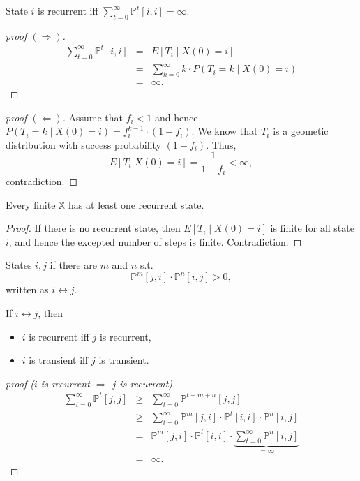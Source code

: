 \begin{lemma}
State $ i $ is recurrent iff $ \sum_{t = 0}^{\infty} \mathbb{P}^{t}[i, i] = \infty $.
\begin{proof}[proof $ (\Rightarrow) $]
\begin{eqnarray*}
\sum_{t = 0}^{\infty} \mathbb{P}^{t}[i, i]
  & = & E[T_{i} \mid X(0) = i] \\
  & = & \sum_{k = 0}^{\infty} k \cdot P(T_{i} = k \mid X(0) = i) \\
  & = & \infty.
\end{eqnarray*}
\end{proof}

\begin{proof}[proof $ (\Leftarrow) $]
Assume that $ f_{i} < 1 $ and hence $ P(T_{i} = k \mid X(0) = i) = f_{i}^{k - 1} \cdot (1 - f_{i}) $. We know that $ T_{i} $ is a geometic distribution with success probability $ (1 - f_{i}) $. Thus,
\[ E[T_{i} | X(0) = i] = \frac{1}{1 - f_{i}} < \infty, \]
contradiction.
\end{proof}
\end{lemma}

\begin{corollary} \label{cor:finite-X-has-recurrent-state}
Every finite $ \mathbb{X} $ has at least one recurrent state.
\begin{proof}
If there is no recurrent state, then $ E[T_{i} \mid X(0) = i] $ is finite for all state $ i $, and hence the excepted number of steps is finite. Contradiction.
\end{proof}
\end{corollary}

\begin{definition}
States $ i, j $  if there are $ m $ and $ n $ s.t.
\[ \mathbb{P}^{m}[j, i] \cdot \mathbb{P}^{n}[i, j] > 0, \]
written as $ i \leftrightarrow j $.
\end{definition}

\begin{lemma} \label{lem:communicate}
If $ i \leftrightarrow j $, then
\begin{itemize}
  \item $ i $ is recurrent iff $ j $ is recurrent,
  \item $ i $ is transient iff $ j $ is transient.
\end{itemize}
\begin{proof}[proof ($ i $ is recurrent $ \Rightarrow $ $ j $ is recurrent)]
\begin{eqnarray*}
\sum_{t = 0}^{\infty} \mathbb{P}^{t}[j, j]
  & \ge & \sum_{t = 0}^{\infty} \mathbb{P}^{t + m + n}[j, j] \\
  & \ge & \sum_{t = 0}^{\infty} \mathbb{P}^{m}[j, i] \cdot \mathbb{P}^{t}[i, i] \cdot \mathbb{P}^{n}[i, j] \\
  & = & \mathbb{P}^{m}[j, i] \cdot \mathbb{P}^{t}[i, i] \cdot \underbrace{\sum_{t = 0}^{\infty} \mathbb{P}^{n}[i, j]}_{= \infty} \\
  & = & \infty.
\end{eqnarray*}
\end{proof}
\end{lemma}

